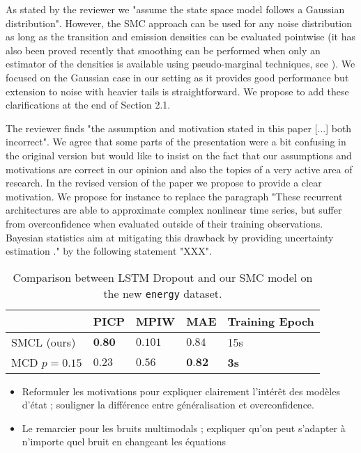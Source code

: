 \documentclass{article}
\begin{document}
As stated by the reviewer we "assume the state space model follows a Gaussian distribution". However, the SMC approach can be used for any noise distribution as long as the transition and emission densities can be evaluated pointwise (it has also been proved recently that smoothing can be performed when only an estimator of the densities is available using pseudo-marginal techniques, see \cite{papier gloaguen lecorff Olsson}). We focused on the Gaussian case  in our setting as it provides good performance but extension to noise with heavier tails is straightforward. We propose to add these clarifications at the end of Section 2.1.

The reviewer finds "the assumption and motivation stated in this paper [...] both incorrect".
We agree that some parts of the presentation were a bit confusing in the original version but would like to insist on the fact that our assumptions and motivations are correct in our opinion and also the topics of a very active area of research.
In the revised version of the paper we propose to provide a clear motivation.
We propose for instance to replace the paragraph "These recurrent architectures are able to approximate complex nonlinear time series, but suffer from overconfidence when evaluated outside of their training observations. Bayesian statistics aim at mitigating this drawback by providing uncertainty estimation \cite{Hinton1995BayesianLF}." by the following statement "XXX".

\begin{table}[htpb]
	\centering
	\caption{Comparison between LSTM Dropout and our SMC model on the new \texttt{energy} dataset.}
	\label{tab:comparison}
	\begin{tabular}{lllll}
		\toprule
		             & PICP            & MPIW    & MAE             & Training Epoch \\
		\toprule
		SMCL (ours)  & $\textbf{0.80}$ & $0.101$ & $0.84$          & 15s            \\
		MCD $p=0.15$ & $0.23$          & $0.56$  & $\textbf{0.82}$ & \textbf{3s}    \\
		\bottomrule
	\end{tabular}
\end{table}

\begin{itemize}
	\item Reformuler les motivations pour expliquer clairement l'intérêt des modèles d'état ; souligner la différence entre généralisation et overconfidence.
	\item Le remarcier pour les bruits multimodals ; expliquer qu'on peut s'adapter à n'importe quel bruit en changeant les équations
\end{itemize}



\end{document}
